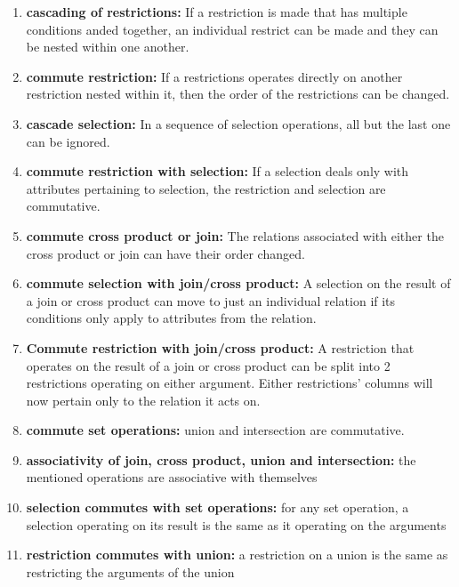 \documentclass{article}
\begin{document}
\begin{enumerate}
  \item \textbf{cascading of restrictions:} If a restriction is made that has multiple conditions anded together,
  an individual restrict can be made and they can be nested within one another.

  \item \textbf{commute restriction:} If a restrictions operates directly on another restriction nested within it, then the order of
  the restrictions can be changed.

  \item \textbf{cascade selection:} In a sequence of selection operations, all but the last one can be ignored.

  \item \textbf{commute restriction with selection:} If a selection deals only with attributes pertaining to selection,
  the restriction and selection are commutative.

  \item \textbf{commute cross product or join:} The relations associated with either the cross product or join
  can have their order changed.

  \item \textbf{commute selection with join/cross product:} A selection on the result of a join or cross product can move to just
  an individual relation if its conditions only apply to attributes from the relation.

  \item \textbf{Commute restriction with join/cross product:} A restriction that operates on the result of a join or cross product
  can be split into 2 restrictions operating on either argument. Either restrictions' columns will now pertain only
  to the relation it acts on.

  \item \textbf{commute set operations:} union and intersection are commutative.

  \item \textbf{associativity of join, cross product, union and intersection:} the mentioned operations are associative with themselves

  \item \textbf{selection commutes with set operations:} for any set operation, a selection operating on its result is the same as
  it operating on the arguments

  \item \textbf{restriction commutes with union:} a restriction on a union is the same as restricting the arguments of the union


\end{enumerate}
\end{document}
